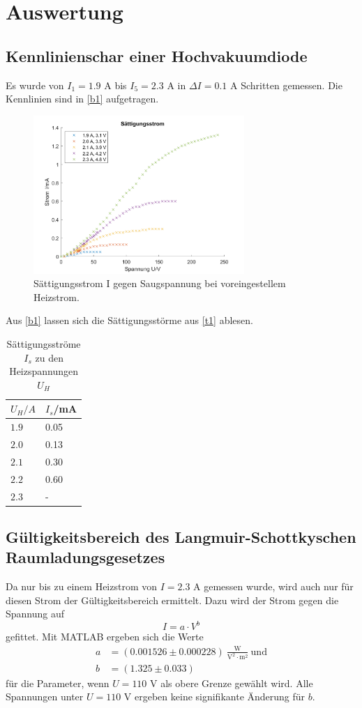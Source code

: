 \section{Auswertung}
\label{sec:Auswertung}
 \subsection{Kennlinienschar einer Hochvakuumdiode}
 Es wurde von $I_{1}=1.9$ A bis $I_{5}=2.3$ A in $\Delta I=0.1$ A Schritten gemessen. Die Kennlinien sind in \autoref{b1} aufgetragen.
 \begin{figure}[H]
 \centering
 \includegraphics[width=8cm]{content/s.png}
 \caption{Sättigungsstrom I gegen Saugspannung bei voreingestellem Heizstrom.}
 \label{b1}
 \end{figure}
 Aus \autoref{b1} lassen sich die Sättigungsstörme aus \autoref{t1} ablesen. 
 \begin{table}[H]
  \centering
  \caption{Sättigungsströme $I_{s}$ zu den Heizspannungen $U_{H}$}
  \begin{tabular}{l|l}
  $U_{H}/A$& $I_{s}$/mA\\\hline
  $1.9$ & 0.05\\
  $2.0$ & 0.13\\
  $2.1$ & 0.30\\
  $2.2$ & 0.60\\
  $2.3$ & -\\\hline
  \end{tabular}
  \label{t1}
 \end{table}

 \subsection{Gültigkeitsbereich des Langmuir-Schottkyschen Raumladungsgesetzes}
 Da nur bis zu einem Heizstrom von $I=2.3$ A gemessen wurde, wird auch nur für diesen Strom der Gültigkeitsbereich ermittelt. Dazu wird der Strom gegen die Spannung auf
 \begin{equation*}
   I=a\cdot V^{b}
 \end{equation*}
 gefittet. Mit MATLAB ergeben sich die Werte
 \begin{align*}
   a&=(0.001526 \pm 0.000228)\ \frac{\textrm{W}}{\textrm{V}^2 \cdot\textrm{m}^2}\ \textrm{und}\\
   b&=(1.325 \pm 0.033)
 \end{align*}
 für die Parameter, wenn $U=110$ V als obere Grenze gewählt wird. Alle Spannungen unter $U=110$ V ergeben keine signifikante Änderung für $b$.
 
